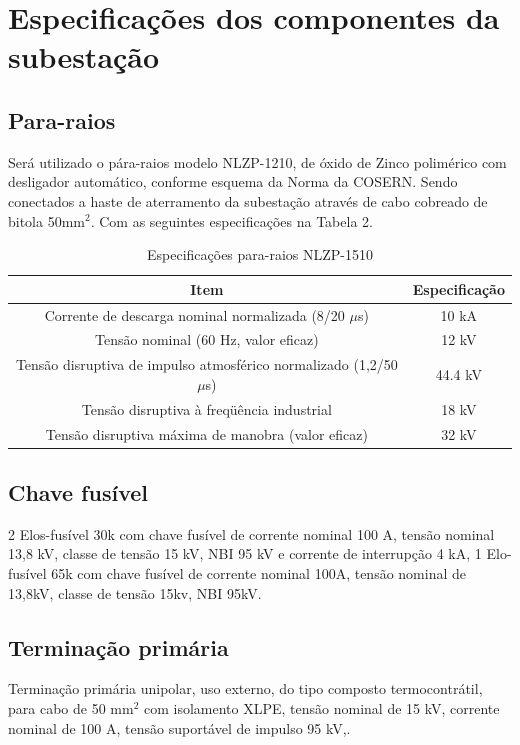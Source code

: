 \section{Especificações dos componentes da subestação}
\subsection{Para-raios}
Será utilizado o pára-raios modelo NLZP-1210, de óxido de Zinco polimérico
com desligador automático, conforme esquema da Norma da COSERN. Sendo conectados a
haste de aterramento da subestação através de cabo cobreado de bitola 50mm$^2$. Com as seguintes
especificações na Tabela 2.

\begin{table}[htbp]
  \centering
    \begin{tabular}{cc}
    \toprule
    \textbf{Item } & \textbf{Especificação} \\
    \midrule
    Corrente de descarga nominal normalizada (8/20 $\mu$s) & 10 kA \\
    Tensão nominal (60 Hz, valor eficaz) & 12 kV \\
    Tensão disruptiva de impulso atmosférico normalizado (1,2/50 $\mu$s) & 44.4 kV  \\
    Tensão disruptiva à freqüência industrial & 18 kV \\
    Tensão disruptiva máxima de manobra (valor eficaz) & 32 kV \\
    \bottomrule
    \end{tabular}%
  \caption{Especificações para-raios NLZP-1510}
\end{table}%


\subsection{Chave fusível}
2 Elos-fusível 30k com chave fusível de corrente nominal 100 A, tensão nominal 13,8 kV, classe de
tensão 15 kV, NBI 95 kV e corrente de interrupção 4 kA, 1 Elo-fusível 65k com chave fusível de corrente nominal 100A, tensão nominal de 13,8kV, classe de tensão 15kv, NBI 95kV.

\subsection{Terminação primária}
Terminação primária unipolar, uso externo, do tipo composto termocontrátil, para cabo de 50 mm$^2$
com isolamento XLPE, tensão nominal de 15 kV, corrente nominal de 100 A, tensão suportável de impulso
95 kV,.

